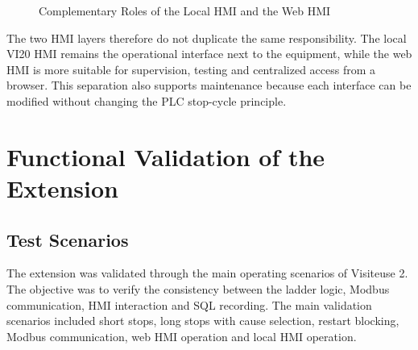 \begin{figure}[H]
\centering
{}
\caption{Complementary Roles of the Local HMI and the Web HMI}
\label{fig:chapter4-13}
\end{figure}

The two HMI layers therefore do not duplicate the same responsibility. The local VI20 HMI remains the operational interface next to the equipment, while the web HMI is more suitable for supervision, testing and centralized access from a browser. This separation also supports maintenance because each interface can be modified without changing the PLC stop-cycle principle.

\section{Functional Validation of the Extension}

\subsection{Test Scenarios}
The extension was validated through the main operating scenarios of Visiteuse 2. The objective was to verify the consistency between the ladder logic, Modbus communication, HMI interaction and SQL recording. The main validation scenarios included short stops, long stops with cause selection, restart blocking, Modbus communication, web HMI operation and local HMI operation.


